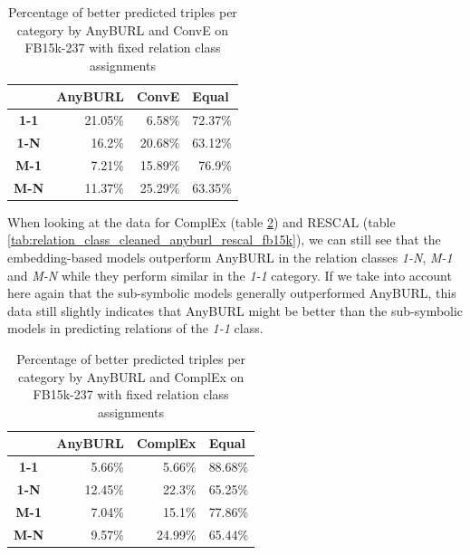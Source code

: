 \begin{table}[H]
\centering
\begin{tabular}{c|rrr}
\multicolumn{1}{l|}{} & \multicolumn{1}{c}{\textbf{AnyBURL}} & \multicolumn{1}{c}{\textbf{ConvE}} & \multicolumn{1}{l}{\textbf{Equal}} \\ \hline
\textbf{1-1} & 21.05\% & 6.58\% & 72.37\% \\
\textbf{1-N} & 16.2\% & 20.68\% & 63.12\% \\
\textbf{M-1} & 7.21\% & 15.89\% & 76.9\% \\
\textbf{M-N} & 11.37\% & 25.29\% & 63.35\%
\end{tabular}
\caption{Percentage of better predicted triples per category by AnyBURL and ConvE on FB15k-237 with fixed relation class assignments}
\label{tab:relation_class_cleaned_anyburl_conve_fb15k}
\end{table}

When looking at the data for ComplEx (table \ref{tab:relation_class_cleaned_anyburl_complex_fb15k}) and RESCAL (table \ref{tab:relation_class_cleaned_anyburl_rescal_fb15k}), we can still see that the embedding-based models outperform AnyBURL in the relation classes \textit{1-N}, \textit{M-1} and \textit{M-N} while they perform similar in the \textit{1-1} category. 
If we take into account here again that the sub-symbolic models generally outperformed AnyBURL, this data still slightly indicates that AnyBURL might be better than the sub-symbolic models in predicting relations of the \textit{1-1} class. 

\begin{table}[H]
\centering
\begin{tabular}{c|rrr}
\multicolumn{1}{l|}{} & \multicolumn{1}{c}{\textbf{AnyBURL}} & \multicolumn{1}{c}{\textbf{ComplEx}} & \multicolumn{1}{l}{\textbf{Equal}} \\ \hline
\textbf{1-1} & 5.66\% & 5.66\% & 88.68\% \\
\textbf{1-N} & 12.45\% & 22.3\% & 65.25\% \\
\textbf{M-1} & 7.04\% & 15.1\% & 77.86\% \\
\textbf{M-N} & 9.57\% & 24.99\% & 65.44\%
\end{tabular}
\caption{Percentage of better predicted triples per category by AnyBURL and ComplEx on FB15k-237 with fixed relation class assignments}
\label{tab:relation_class_cleaned_anyburl_complex_fb15k}
\end{table}

